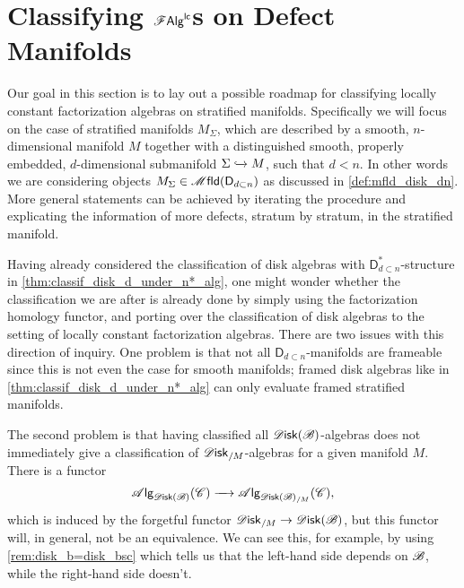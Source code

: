 \documentclass[../text]{subfiles}
\begin{document}
\section{Classifying \texorpdfstring{$\mathscr{F} \mathsf{Alg}^{\mathsf{lc}}$}{FAlglc}s on Defect Manifolds}\label{ch:classif_defect_mfld}

Our goal in this section is to lay out a possible roadmap for classifying locally constant factorization algebras on stratified manifolds. Specifically we will focus on the case of stratified manifolds $M_{\Sigma}$, which are described by a smooth, $n$-dimensional manifold $M$ together with a distinguished smooth, properly embedded, $d$-dimensional submanifold $\Sigma \xhookrightarrow{} M$, such that $d < n$. In other words we are considering objects $M_{\Sigma} \in \mfld(\mathsf{D}_{d \subset n})$ as discussed in \cref{def:mfld_disk_dn}. More general statements can be achieved by iterating the procedure and explicating the information of more defects, stratum by stratum, in the stratified manifold.

\begin{remark}\label{rem:disk_not_enough}
    Having already considered the classification of disk algebras with $\mathsf{D}_{d \subset n}^*$-structure in \cref{thm:classif_disk_d_under_n*_alg}, one might wonder whether the classification we are after is already done by simply using the factorization homology functor, and porting over the classification of disk algebras to the setting of locally constant factorization algebras. There are two issues with this direction of inquiry. One problem is that not all $\mathsf{D}_{d \subset n}$-manifolds are frameable since this is not even the case for smooth manifolds; framed disk algebras like in \cref{thm:classif_disk_d_under_n*_alg} can only evaluate framed stratified manifolds.
    
    The second problem is that having classified all $\disk(\bstr)$-algebras does not immediately give a classification of $\disk_{/M}$-algebras for a given manifold $M$. There is a functor
    \begin{equation}
        \alg{\disk(\bstr)}(\catC) \xrightarrow{\quad} \alg{\disk(\bstr)_{/M}} (\catC),
    \end{equation}
    which is induced by the forgetful functor $\disk_{/M} \rightarrow \disk(\bstr)$, but this functor will, in general, not be an equivalence. We can see this, for example, by using \cref{rem:disk_b=disk_bsc} which tells us that the left-hand side depends on $\mathscr{B}$, while the right-hand side doesn't. 
\end{remark}
\end{document}
